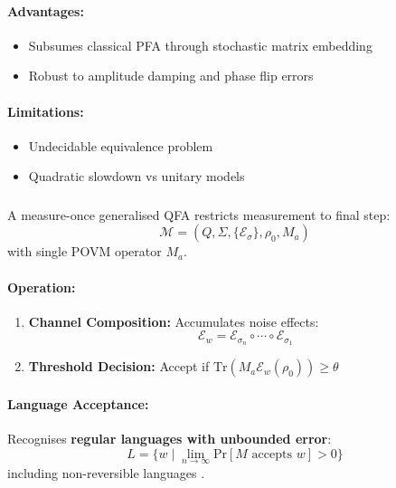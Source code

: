 \paragraph{Advantages:}
\begin{itemize}
    \item Subsumes classical PFA through stochastic matrix embedding
    \item Robust to amplitude damping and phase flip errors
\end{itemize}

\paragraph{Limitations:}
\begin{itemize}
    \item Undecidable equivalence problem \cite{blondel2003equivalence}
    \item Quadratic slowdown vs unitary models
\end{itemize}

\subsubsection{}
\label{subsec:mo-1gqfa}

\begin{definition}
A measure-once generalised QFA restricts measurement to final step:
\[
\mathcal{M} = (Q, \Sigma, \{\mathcal{E}_\sigma\}, \rho_0, M_a)
\]
with single POVM operator $M_a$.
\end{definition}

\paragraph{Operation:}
\begin{enumerate}
    \item \textbf{Channel Composition:} Accumulates noise effects:
    \[
    \mathcal{E}_w = \mathcal{E}_{\sigma_n} \circ \cdots \circ \mathcal{E}_{\sigma_1}
    \]
    \item \textbf{Threshold Decision:} Accept if $\text{Tr}(M_a\mathcal{E}_w(\rho_0)) \geq \theta$
\end{enumerate}

\paragraph{Language Acceptance:}
Recognises \textbf{regular languages with unbounded error}:
\[
L = \{w \mid \lim_{n\to\infty} \text{Pr}[M \text{ accepts } w] > 0\}
\]
including non-reversible languages \cite{hirvensalo2012quantum}.

